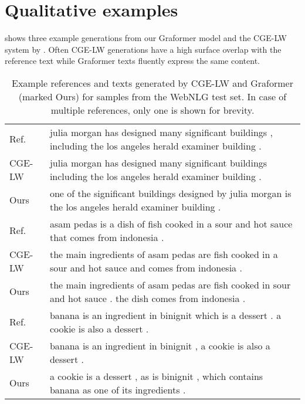 \documentclass[11pt]{article}
\begin{document}
\section{Qualitative examples}
\label{app:qualitative}

 shows three example generations from our Graformer model and the CGE-LW system by \citet{ribeiro20}.
Often CGE-LW generations have a high surface overlap with the reference text while Graformer texts fluently express the same content.


\begin{table}[!h]
	\begin{tabularx}{\linewidth}{lX}
		\toprule
		Ref.&julia morgan has designed many significant buildings , including the los angeles herald examiner building .\\
		CGE-LW & julia morgan has designed many significant buildings including the los angeles herald examiner building .\\
		Ours & one of the significant buildings designed by julia morgan is the los angeles herald examiner building .\\
		\midrule
		Ref.&asam pedas is a dish of fish cooked in a sour and hot sauce that comes from indonesia .\\
		CGE-LW & the main ingredients of asam pedas are fish cooked in a sour and hot sauce and comes from indonesia .\\
		Ours & the main ingredients of asam pedas are fish cooked in sour and hot sauce . the dish comes from indonesia .\\
		\midrule
		Ref.&banana is an ingredient in binignit which is a dessert . a cookie is also a dessert .\\
		CGE-LW & banana is an ingredient in binignit , a cookie is also a dessert .\\
		Ours & a cookie is a dessert , as is binignit , which contains banana as one of its ingredients . \\
		\bottomrule
	\end{tabularx}
	\caption{Example references and texts generated by CGE-LW \citep{ribeiro20} and Graformer (marked Ours) for samples from the WebNLG test set. In case of multiple references, only one is shown for brevity.}
	\label{tab:qualitative_webnlg}
\end{table} 
\end{document}
